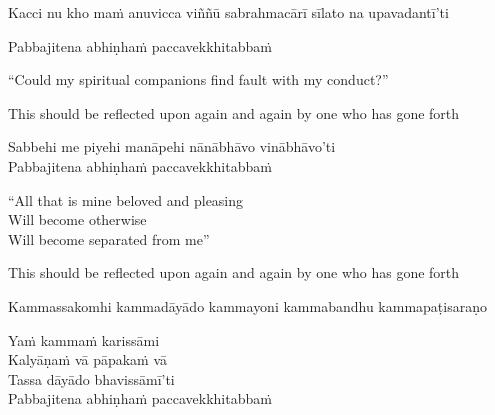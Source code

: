 \vspace{8pt}

\begin{pali-hangtogether}
Kacci nu kho maṁ anuvicca viññū sabrahmacārī sīlato na upavadantī'ti
\end{pali-hangtogether}
Pabbajitena abhiṇhaṁ paccavekkhitabbaṁ

\begin{english}
  ``Could my spiritual companions find fault with my conduct?''\\
\begin{english-hangtogether}
  This should be reflected upon again and again by one who has gone forth
\end{english-hangtogether}
\end{english}

Sabbehi me piyehi manāpehi nānābhāvo vinābhāvo'ti\\
Pabbajitena abhiṇhaṁ paccavekkhitabbaṁ

\begin{english}
  ``All that is mine beloved and pleasing\\
  Will become otherwise\\
  Will become separated from me''
\begin{english-hangtogether}
  This should be reflected upon again and again by one who has gone forth
\end{english-hangtogether}
\end{english}

\vspace{8pt}

\begin{pali-hangtogether}
Kammassakomhi kammadāyādo kammayoni kammabandhu kammapaṭisaraṇo\\
\end{pali-hangtogether}
Yaṁ kammaṁ karissāmi\\
Kalyāṇaṁ vā pāpakaṁ vā\\
Tassa dāyādo bhavissāmī'ti\\
Pabbajitena abhiṇhaṁ paccavekkhitabbaṁ

